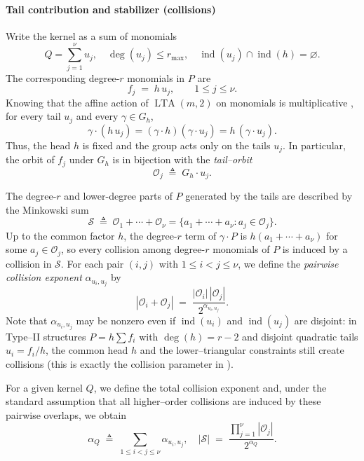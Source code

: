 \documentclass[conference]{IEEEtran}
\theoremstyle{definition}
\DeclareMathOperator{\LTA}{LTA}
\newcommand{\ind}{\operatorname{ind}}
\newcommand{\Stab}{\operatorname{Stab}}
\begin{document}
\paragraph{Tail contribution and stabilizer (collisions)}
Write the kernel as a sum of monomials
\[
Q = \sum_{j=1}^{\nu} u_j,\quad \deg(u_j)\le r_{\max},\quad
\ind(u_j)\cap\ind(h)=\varnothing.
\]
The corresponding degree-$r$ monomials in $P$ are
\[
f_j \;=\; h\,u_j,\qquad 1\le j\le\nu.
\]
Knowing that the affine action of $\LTA(m,2)$
on monomials is multiplicative \cite{rowshan2025weight}, for every tail $u_j$ and
every $\gamma\in G_h$,
\[
\gamma\cdot(h\,u_j)
  = (\gamma\cdot h)(\gamma\cdot u_j)
  = h\,(\gamma\cdot u_j).
\]
Thus, the head $h$ is fixed and the group acts only on the tails
$u_j$. In particular, the orbit of $f_j$ under $G_h$ is in bijection
with the \emph{tail–orbit}
\[
\mathcal{O}_j \;\triangleq\; G_h\cdot u_j.
\]

The degree-$r$ and lower-degree parts of $P$ generated by the tails are
described by the Minkowski sum
\[
\mathcal{S}
  \;\triangleq\;
  \mathcal{O}_1 + \cdots + \mathcal{O}_\nu
  = \{a_1+\cdots+a_\nu : a_j\in\mathcal{O}_j\}.
\]
Up to the common factor $h$, the degree-$r$ term of $\gamma\cdot P$ is $h(a_1+\cdots+a_\nu)$ for some $a_j\in\mathcal{O}_j$, so every collision among degree-$r$ monomials of $P$ is induced by a collision in $\mathcal{S}$. 
For each pair $(i,j)$ with $1\le i<j\le\nu$, we define the
\emph{pairwise collision exponent} $\alpha_{u_i,u_j}$ by \cite[Prop. 1]{vlad1.5d}
\[
|\mathcal{O}_i+\mathcal{O}_j|
  \;=\;
  \frac{|\mathcal{O}_i|\,|\mathcal{O}_j|}{2^{\alpha_{u_i,u_j}}}.
\]
Note that $\alpha_{u_i,u_j}$ may be nonzero even if $\ind(u_i)$ and
$\ind(u_j)$ are disjoint: in Type–II structures
$P=h\sum f_i$ with $\deg(h)=r-2$ and disjoint quadratic tails
$u_i=f_i/h$, the common head $h$ and the lower–triangular constraints
still create collisions (this is exactly the collision parameter in  \cite[Def. 8]{vlad1.5d}).

For a given kernel $Q$, we define the total collision exponent and, under the standard assumption that all higher–order collisions are
induced by these pairwise overlaps, we obtain
\[
\alpha_Q \;\triangleq\; \sum_{1\le i<j\le\nu} \alpha_{u_i,u_j}, \quad |\mathcal{S}|
  \;=\;
  \frac{\prod_{j=1}^{\nu} |\mathcal{O}_j|}{2^{\alpha_Q}}.
\]
\end{document}
